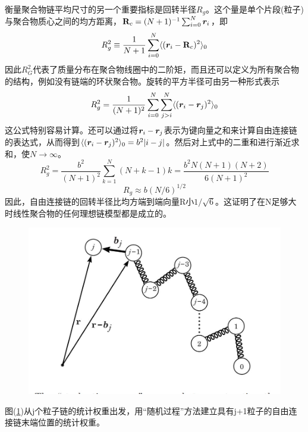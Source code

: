 衡量聚合物链平均尺寸的另一个重要指标是回转半径$R_{g}$。这个量是单个片段(粒子)与聚合物质心之间的均方距离，$\mathbf{R}_{c}=(N+1)^{-1} \sum _{i=0}^{N} \bm{r}_{i}$，即\\
\begin{equation}
R_{g}^2 \equiv \frac{1}{N+1} \sum _{i=0}^{N} \langle (\bm{r}_{i}- \mathbf{R}_{c})^2 \rangle_{0} 
\label{2.14}
\end{equation}
因此$R_{G}^2$代表了质量分布在聚合物线圈中的二阶矩，而且还可以定义为所有聚合物的结构，例如没有链端的环状聚合物。旋转的平方半径可由另一种形式表示\\
\begin{equation}
R_{g}^2=\frac{1}{(N+1)^2} \sum _{i=0}^{N} \sum _{j>i}^{N} \langle (\bm{r}_{i}- \bm{r}_{j})^2 \rangle_{0} 
\label{2.15}
\end{equation}
这公式特别容易计算。还可以通过将$\bm{r}_{i}-\bm{r}_{j}$表示为键向量之和来计算自由连接链的表达式，从而得到$\langle (\bm{r}_{i}- \bm{r}_{j})^2 \rangle_{0}=b^2 |i-j|$。然后对上式中的二重和进行渐近求和，使$N \rightarrow \infty $。\\
\begin{equation}
R_{g}^{2} = \frac{b^2}{(N+1)^2} \sum _{k=1} ^{N} (N+k-1)k=\frac{b^2 N(N+1)(N+2)}{6(N+1)^2}
\end{equation}
\begin{equation}
R_{g}\approx b(N/6)^{1/2}
\label{2.16}
\end{equation}
因此，自由连接链的回转半径比均方端到端向量R小$1/\sqrt{6}$。这证明了在N足够大时线性聚合物的任何理想链模型都是成立的。\\
\begin{figure}[H]
	\centering   
	\includegraphics[width=12cm]{./figures/3.png}
	\caption{ }
	\label{2.2}
\end{figure}
图(\ref{2.2})从j个粒子链的统计权重出发，用“随机过程”方法建立具有j+1粒子的自由连接链末端位置的统计权重。\\

